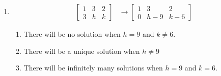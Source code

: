 \documentclass[12pt]{article}
\begin{document}
\begin{enumerate}[label=\textbf{1.2.24}]
    \item \begin{align*}
    \begin{bmatrix}
        1 & 3 & 2 \\
        3 & h & k
    \end{bmatrix} &\rightarrow
    \begin{bmatrix}
        1 & 3 & 2 \\
        0 & h-9 & k-6
    \end{bmatrix}
\end{align*}
\begin{enumerate}[label=\alph*.]
    \item There will be no solution when $h=9$ and $k \neq 6$.
    \item There will be a unique solution when $h \neq 9$
    \item There will be infinitely many solutions when $h=9$ and $k=6$.
\end{enumerate}
\end{enumerate}
\end{document}
